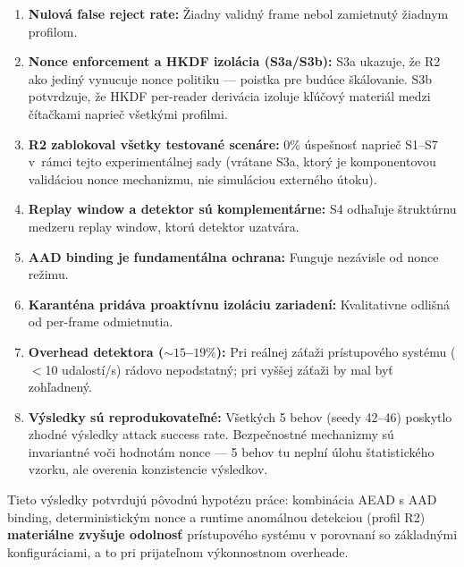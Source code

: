 \begin{enumerate}[leftmargin=*,itemsep=2pt]
  \item \textbf{Nulová false reject rate:} Žiadny validný frame nebol zamietnutý žiadnym profilom.
  \item \textbf{Nonce enforcement a HKDF izolácia (S3a/S3b):} S3a ukazuje, že R2 ako jediný vynucuje nonce politiku --- poistka pre budúce škálovanie. S3b potvrdzuje, že HKDF per-reader derivácia izoluje kľúčový materiál medzi čítačkami naprieč všetkými profilmi.
  \item \textbf{R2 zablokoval všetky testované scenáre:} 0\% úspešnosť naprieč S1--S7 v~rámci tejto experimentálnej sady (vrátane S3a, ktorý je komponentovou validáciou nonce mechanizmu, nie simuláciou externého útoku).
  \item \textbf{Replay window a detektor sú komplementárne:} S4 odhaľuje štruktúrnu medzeru replay window, ktorú detektor uzatvára.
  \item \textbf{AAD binding je fundamentálna ochrana:} Funguje nezávisle od nonce režimu.
  \item \textbf{Karanténa pridáva proaktívnu izoláciu zariadení:} Kvalitativne odlišná od per-frame odmietnutia.
  \item \textbf{Overhead detektora (${\sim}15$--$19\%$):} Pri reálnej záťaži prístupového systému ($<$10 udalostí/s) rádovo nepodstatný; pri vyššej záťaži by mal byť zohľadnený.
  \item \textbf{Výsledky sú reprodukovateľné:} Všetkých 5 behov (seedy 42--46) poskytlo zhodné výsledky attack success rate. Bezpečnostné mechanizmy sú invariantné voči hodnotám nonce --- 5 behov tu neplní úlohu štatistického vzorku, ale overenia konzistencie výsledkov.
\end{enumerate}

Tieto výsledky potvrdujú pôvodnú hypotézu práce: kombinácia AEAD s AAD binding, deterministickým nonce a runtime anomálnou detekciou (profil R2) \textbf{materiálne zvyšuje odolnosť} prístupového systému v porovnaní so základnými konfiguráciami, a to pri prijateľnom výkonnostnom overheade.
